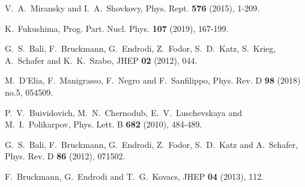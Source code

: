 \begin{thebibliography}{1000}


V.~A.~Miransky and I.~A.~Shovkovy,
Phys. Rept. \textbf{576} (2015), 1-209.

K.~Fukushima,
Prog. Part. Nucl. Phys. \textbf{107} (2019), 167-199.



G.~S.~Bali, F.~Bruckmann, G.~Endrodi, Z.~Fodor, S.~D.~Katz, S.~Krieg, A.~Schafer and K.~K.~Szabo,
JHEP \textbf{02} (2012), 044.

M.~D'Elia, F.~Manigrasso, F.~Negro and F.~Sanfilippo,
Phys. Rev. D \textbf{98} (2018) no.5, 054509.


P.~V.~Buividovich, M.~N.~Chernodub, E.~V.~Luschevskaya and M.~I.~Polikarpov,
Phys. Lett. B \textbf{682} (2010), 484-489.


G.~S.~Bali, F.~Bruckmann, G.~Endrodi, Z.~Fodor, S.~D.~Katz and A.~Schafer,
Phys. Rev. D \textbf{86} (2012), 071502.

F.~Bruckmann, G.~Endrodi and T.~G.~Kovacs,
JHEP \textbf{04} (2013), 112.



\end{thebibliography}
